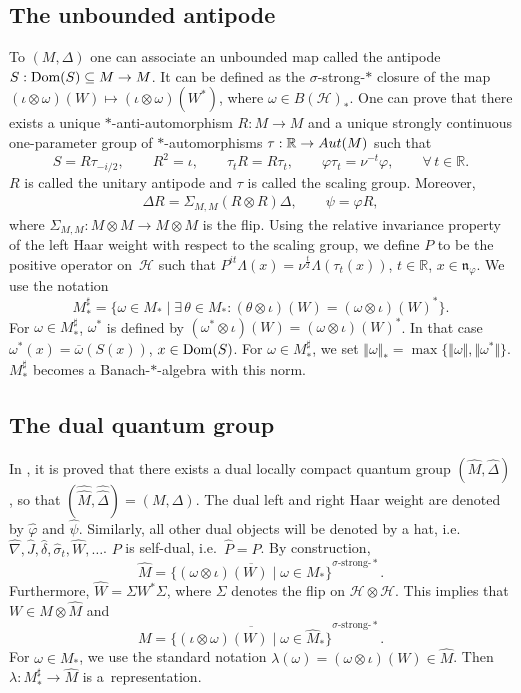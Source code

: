 \documentclass[11pt]{article}
\numberwithin{equation}{section}
\theoremstyle{definition}
\newcommand{\cHil}{\mathcal{H}}
\newcommand{\nphi}{\mathfrak{n}_\varphi}
\newcommand{\Dom}{\text{\rm Dom}}
\begin{document}
\subsection*{The unbounded antipode}

To $(M, \Delta)$ one can associate an unbounded map called the antipode $S: \Dom(S) \subseteq M \rightarrow M$. It can be def\/ined as the $\sigma$-strong-$\ast$ closure of the map $(\iota \otimes \omega)(W) \mapsto (\iota \otimes \omega)(W^\ast)$, where $\omega \in B(\cHil)_\ast$.
 One can prove that there exists a unique $\ast$-anti-automorphism $R: M \rightarrow M$ and a unique strongly continuous one-parameter group of $\ast$-automorphisms $\tau: \mathbb{R} \rightarrow {\rm Aut}(M)$ such that
\[
S = R \tau_{-i/2}, \qquad R^2 = \iota, \qquad \tau_t R = R \tau_t, \qquad \varphi \tau_t = \nu^{-t} \varphi, \qquad \forall\, t \in \mathbb{R}.
\]
$R$ is called the unitary antipode and $\tau$ is called the scaling group. Moreover,
\begin{gather}\label{EqnRCom}
\Delta R = \Sigma_{M,M} (R \otimes R) \Delta, \qquad \psi = \varphi R,
\end{gather}
where $\Sigma_{M,M}: M \otimes M \rightarrow M \otimes M$ is the f\/lip. Using the relative invariance property of the left Haar weight with respect to the scaling group, we def\/ine $P$ to be the positive operator on~$\cHil$ such that $P^{it} \Lambda(x) = \nu^{\frac{t}{2}} \Lambda(\tau_t(x))$, $t \in \mathbb{R}$, $x \in \nphi$.
 We use the notation
\[
    M_\ast^{\sharp} = \big\{ \omega \in M_\ast \mid \exists\, \theta \in M_\ast: (\theta \otimes \iota)(W) = (\omega \otimes \iota)(W)^\ast \big\}.
\]
For $\omega \in M_\ast^\sharp$, $\omega^\ast$ is def\/ined by $(\omega^\ast \otimes \iota)(W) = (\omega \otimes \iota)(W)^\ast$. In that case $\omega^\ast(x) = \overline{\omega}(S(x))$, $x \in \Dom(S)$. For $\omega \in M_\ast^\sharp$, we set $\Vert \omega \Vert_\ast = \max \{\Vert \omega \Vert, \Vert \omega^\ast \Vert \}$. $M_\ast^\sharp$ becomes a Banach-$\ast$-algebra with this norm.


\subsection*{The dual quantum group}
In \cite{KusVae, KusVaeII}, it is
proved that there exists a dual locally compact quantum group
$(\hat{M},\hat{\Delta})$, so that
$(\hat{\hat{M}},\hat{\hat{\Delta}}) = (M,\Delta)$. The dual left
and right Haar weight are denoted by $\hat{\varphi}$ and
$\hat{\psi}$. Similarly, all other dual objects will be denoted by
a hat, i.e.\ $\hat{\nabla}, \hat{J}, \hat{\delta}, \hat{\sigma}_t, \hat{W}, \ldots$.  $P$ is self-dual, i.e.\ $\hat{P} = P$. By construction,
\[\hat{M} = \overline{\big\{ (\omega
\otimes \iota)(W) \mid \omega \in M_\ast
\big\}}^{\sigma\text{-strong-}\ast}.
\] Furthermore, $\hat{W} =
\Sigma W^\ast \Sigma$, where $\Sigma$ denotes the f\/lip on $\cHil
\otimes \cHil$. This implies that $W \in M \otimes \hat{M}$ and
\[
M = \overline{\big\{ (\iota \otimes \omega)(W) \mid \omega \in
\hat{M}_\ast \big\}}^{\sigma\text{-strong-}\ast}.
\]
 For $\omega \in
M_\ast$, we use the standard notation $\lambda(\omega) = (\omega
\otimes \iota) (W) \in \hat{M}$. Then $\lambda: M_\ast^\sharp \rightarrow \hat{M}$ is a~representation.
\end{document}
